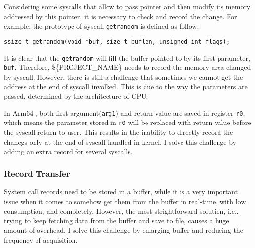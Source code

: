 Considering some syscalls that allow to pass pointer and then modify its memory addressed by this pointer, it is necessary to check and record the change. For example, the prototype of syscall \texttt{getrandom} is defined as follow:\cite{getrandom2}


\centerline{\texttt{ssize\_t getrandom(void *buf, size\_t buflen, unsigned int flags);}}

It is clear that the \texttt{getrandom} will fill the buffer pointed to by its first parameter, \texttt{buf}. Therefore, \$\{PROJECT\_NAME\} needs to record the memory area changed by syscall. However, there is still a challenge that sometimes we cannot get the address at the end of syscall involked. This is due to the way the parameters are passed, determined by the architecture of CPU.

In Arm64 \cite{syscall}, both first argument(\texttt{arg1}) and return value are saved in register \texttt{r0}, which means the parameter stored in \texttt{r0} will be replaced with return value before the syscall return to user. This results in the inability to directly record the chanegs only at the end of syscall handled in kernel. I solve this challenge by adding an extra record for several syscalls.




\subsubsection{Record Transfer}

System call records need to be stored in a buffer, while it is a very important issue when it comes to somehow get them from the buffer in real-time, with low consumption, and completely. However, the most strightforward solution, i.e., trying to keep fetching data from the buffer and save to file, causes a huge amount of overhead. I solve this challenge by enlarging buffer and reducing the frequency of acquisition.



